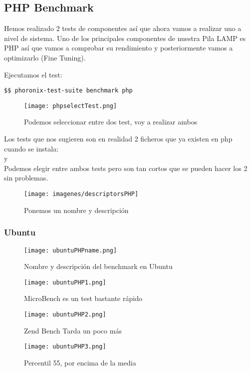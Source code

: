\subsection{PHP Benchmark}
Hemos realizado 2 tests de componentes así que ahora vamos a realizar uno a nivel de sistema. Uno de los principales componentes de nuestra Pila LAMP es PHP así que vamos a comprobar su rendimiento y posteriormente vamos a optimizarlo (Fine Tuning).

Ejecutamos el test:
\begin{verbatim}
$$ phoronix-test-suite benchmark php
\end{verbatim}

\begin{figure}[H]
	\centering
	\texttt{[image: phpselectTest.png]}
	\caption{Podemos seleccionar entre dos test, voy a realizar ambos}
\end{figure}
Los tests que nos sugieren son en realidad 2 ficheros que ya existen en php cuando se instala: \\  \cite{phpBench} y  \cite{phpMicroBench} \\
Podemos elegir entre ambos tests pero son tan cortos que se pueden hacer los 2 sin problemas. \\
\begin{figure}[H]
	\centering
	\texttt{[image: imagenes/descriptorsPHP]}
	\caption{Ponemos un nombre y descripción}
	\label{fig:descriptorsphp}
\end{figure}

\subsubsection{Ubuntu}
\begin{figure}[H]
	\centering
	\texttt{[image: ubuntuPHPname.png]}
	\caption{Nombre y descripción del benchmark en Ubuntu}
\end{figure}
\begin{figure}[H]
	\centering
	\texttt{[image: ubuntuPHP1.png]}
	\caption{MicroBench es un test bastante rápido}
\end{figure}

\begin{figure}[H]
	\centering
	\texttt{[image: ubuntuPHP2.png]}
	\caption{Zend Bench Tarda un poco más}
\end{figure}

\begin{figure}[H]
	\centering
	\texttt{[image: ubuntuPHP3.png]}
	\caption{Percentil 55, por encima de la media}
\end{figure}

